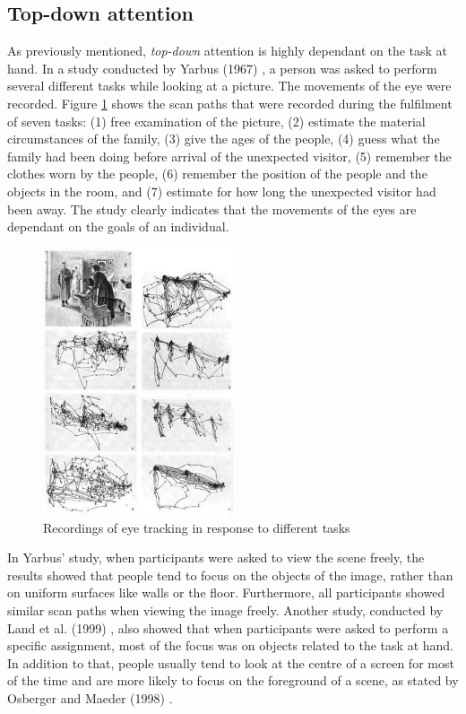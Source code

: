 \subsection{Top-down attention}\label{subsec:topdown_attention}
As previously mentioned, \textit{top-down} attention is highly dependant on the task at hand. In a study conducted by Yarbus (1967) \cite{Yarbus1967}, a person was asked to perform several different tasks while looking at a picture. The movements of the eye were recorded. Figure \ref{fig:eye_movement_recording} shows the scan paths that were recorded during the fulfilment of seven tasks: (1) free examination of the picture, (2) estimate the material circumstances of the family, (3) give the ages of the people, (4) guess what the family had been doing before arrival of the unexpected visitor, (5) remember the clothes worn by the people, (6) remember the position of the people and the objects in the room, and (7) estimate for how long the unexpected visitor had been away. The study clearly indicates that the movements of the eyes are dependant on the goals of an individual. 

\begin{figure}[h!]
	\centering
	\includegraphics[width=0.5\textwidth]{figures/eye_movement_recording.jpg}
	\caption{Recordings of eye tracking in response to different tasks \cite{sundstedt2012gazing}}\label{fig:eye_movement_recording}
\end{figure}

In Yarbus' study, when participants were asked to view the scene freely, the results showed that people tend to focus on the objects of the image, rather than on uniform surfaces like walls or the floor. Furthermore, all participants showed similar scan paths when viewing the image freely. Another study, conducted by Land et al. (1999) \cite{Land1999}, also showed that when participants were asked to perform a specific assignment, most of the focus was on objects related to the task at hand.
In addition to that, people usually tend to look at the centre of a screen for most of the time and are more likely to focus on the foreground of a scene, as stated by Osberger and Maeder (1998) \cite{osberger1998automatic}.

